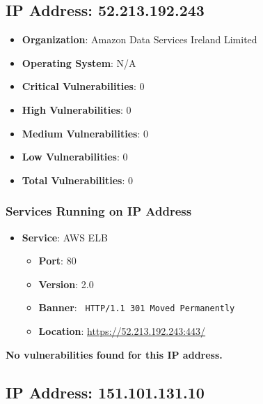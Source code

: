 \documentclass{article}
\begin{document}
\clearpage



\subsection*{IP Address: 52.213.192.243}

\begin{itemize}
    \item \textbf{Organization}: Amazon Data Services Ireland Limited
    \item \textbf{Operating System}:  N/A 
    \item \textbf{Critical Vulnerabilities}: 0
    \item \textbf{High Vulnerabilities}: 0
    \item \textbf{Medium Vulnerabilities}: 0
    \item \textbf{Low Vulnerabilities}: 0
    \item \textbf{Total Vulnerabilities}: 0
\end{itemize}

\subsubsection*{Services Running on IP Address}

\begin{itemize}
    
        \item \textbf{Service}: AWS ELB
        \begin{itemize}
            \item \textbf{Port}: 80
            \item \textbf{Version}:  2.0 
            \item \textbf{Banner}: \texttt{ HTTP/1.1 301 Moved Permanently
 }
            \item \textbf{Location}: \href{ https://52.213.192.243:443/ }{ https://52.213.192.243:443/ }
        \end{itemize}
    
\end{itemize}


\textbf{No vulnerabilities found for this IP address.}


\clearpage



\subsection*{IP Address: 151.101.131.10}
\end{document}
